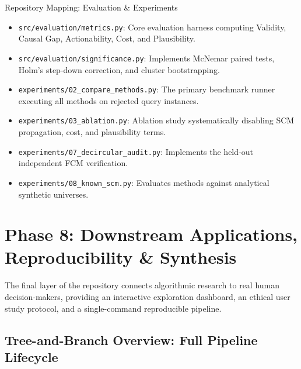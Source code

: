 \documentclass[11pt,a4paper]{article}
\begin{document}
\begin{codeanatomy}{Repository Mapping: Evaluation \& Experiments}
\begin{itemize}[leftmargin=1.2em]
    \item \texttt{src/evaluation/metrics.py}: Core evaluation harness computing Validity, Causal Gap, Actionability, Cost, and Plausibility.
    \item \texttt{src/evaluation/significance.py}: Implements McNemar paired tests, Holm's step-down correction, and cluster bootstrapping.
    \item \texttt{experiments/02\_compare\_methods.py}: The primary benchmark runner executing all methods on rejected query instances.
    \item \texttt{experiments/03\_ablation.py}: Ablation study systematically disabling SCM propagation, cost, and plausibility terms.
    \item \texttt{experiments/07\_decircular\_audit.py}: Implements the held-out independent FCM verification.
    \item \texttt{experiments/08\_known\_scm.py}: Evaluates methods against analytical synthetic universes.
\end{itemize}
\end{codeanatomy}

\newpage
\section{Phase 8: Downstream Applications, Reproducibility \& Synthesis}
\label{sec:phase8}

The final layer of the repository connects algorithmic research to real human decision-makers, providing an interactive exploration dashboard, an ethical user study protocol, and a single-command reproducible pipeline.

\subsection{Tree-and-Branch Overview: Full Pipeline Lifecycle}
\end{document}
